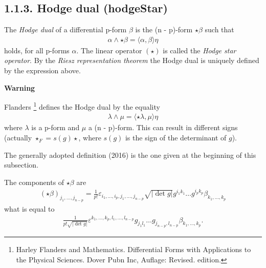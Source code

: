 \documentclass[letterpaper,10pt,english]{sphinxmanual}
\begin{document}
\subsection{1.1.3. Hodge dual (\textbf{hodgeStar})}
\label{section-1.0:hodge-dual-hodgestar}
The \emph{Hodge dual} of a differential p-form \(\beta\) is the (n - p)-form
\(\star \beta\) such that
\begin{equation*}
\begin{split}\alpha \wedge \star \beta = \langle \alpha, \beta \rangle \eta \label{hodge}\end{split}
\end{equation*}
holds, for all p-forms \(\alpha\). The linear operator \((\star)\) is
called the \emph{Hodge star operator}. By the \emph{Riesz representation theorem} the
Hodge dual is uniquely defined by the expression above.

\textbf{Warning}

Flanders \footnote[4]{\sphinxAtStartFootnote%
Harley Flanders and Mathematics. Differential Forms with Applications to
the Physical Sciences. Dover Pubn Inc, Auflage: Revised. edition.
} defines the Hodge dual by the equality
\begin{equation*}
\begin{split}\lambda \wedge \mu = \langle \star \lambda, \mu \rangle \eta\end{split}
\end{equation*}
where \(\lambda\) is a p-form and \(\mu\) a (n - p)-form.
This can result in different signs (actually \(\star_F = s(g)\star\),
where \(s(g)\) is the sign of the determinant of \(g\)).

The generally adopted definition (2016) is the one given at the beginning
of this subsection.

The components of \(\star \beta\) are
\begin{equation*}
\begin{split}(\star \beta)_{j_1, \ldots, j_{n - p}} = \frac{1}{p!} \varepsilon_{i_1,
 \ldots, i_p, j_1, \ldots, j_{n - p}}  \sqrt{| \det g |} g^{i_1 k_1} \ldots
 g^{i_p k_p} \beta_{k_1, \ldots, k_p}\end{split}
\end{equation*}
what is equal to
\begin{equation*}
\begin{split}\frac{1}{p! \sqrt{| \det g |}} \varepsilon_{}^{k_1, \ldots, k_p, l_1,
 \ldots, l_{n - p}} g_{j_1 l_1} \ldots g_{j_{n - p}, l_{n - p}} \beta_{k_1,
 \ldots, k_p} .\end{split}
\end{equation*}
\end{document}
